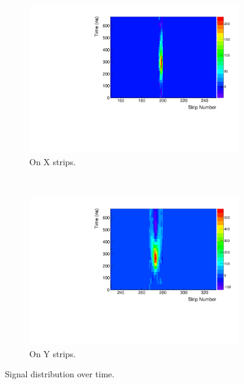 \documentclass[a4paper,11pt]{article}
\begin{document}
\begin{figure}[h!]
        \centering
         \begin{subfigure}[b]{0.45\textwidth}
   	\includegraphics[keepaspectratio=true, width=\textwidth]{Figures/event_13DownX_timeVSchannel.pdf}
	\caption{On X strips.}
	\label{sigvstime-X}
        \end{subfigure}
         ~
         \begin{subfigure}[b]{0.45\textwidth}
        \centering
   	\includegraphics[keepaspectratio=true, width=\textwidth]{Figures/event_13DownY_timeVSchannel.pdf}
	\caption{On Y strips.}
                \label{sigvstime-Yt}
        \end{subfigure}
         \caption{Signal distribution over time.}
        \label{sigvstime}
\end{figure}
\end{document}
